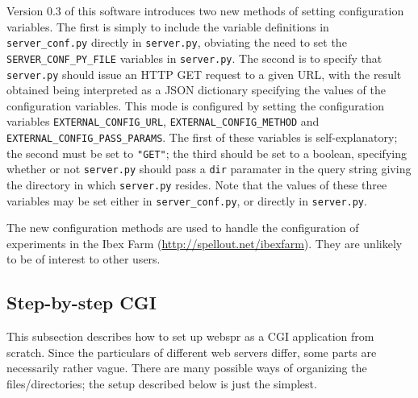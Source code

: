 \documentclass[]{article}
\begin{document}
Version 0.3 of this software introduces two new methods of setting
configuration variables. The first is simply to include the variable
definitions in \texttt{server\_conf.py} directly in \texttt{server.py},
obviating the need to set the \texttt{SERVER\_CONF\_PY\_FILE} variables
in \texttt{server.py}. The second is to specify that \texttt{server.py}
should issue an HTTP GET request to a given URL, with the result
obtained being interpreted as a JSON dictionary specifying the values of
the configuration variables. This mode is configured by setting the
configuration variables \texttt{EXTERNAL\_CONFIG\_URL},
\texttt{EXTERNAL\_CONFIG\_METHOD} and
\texttt{EXTERNAL\_CONFIG\_PASS\_PARAMS}. The first of these variables is
self-explanatory; the second must be set to \texttt{"GET"}; the third
should be set to a boolean, specifying whether or not \texttt{server.py}
should pass a \texttt{dir} paramater in the query string giving the
directory in which \texttt{server.py} resides. Note that the values of
these three variables may be set either in \texttt{server\_conf.py}, or
directly in \texttt{server.py}.

The new configuration methods are used to handle the configuration of
experiments in the Ibex Farm (\url{http://spellout.net/ibexfarm}). They
are unlikely to be of interest to other users.

\subsection{Step-by-step CGI}\label{step-by-step-cgi}

This subsection describes how to set up webspr as a CGI application from
scratch. Since the particulars of different web servers differ, some
parts are necessarily rather vague. There are many possible ways of
organizing the files/directories; the setup described below is just the
simplest.
\end{document}

